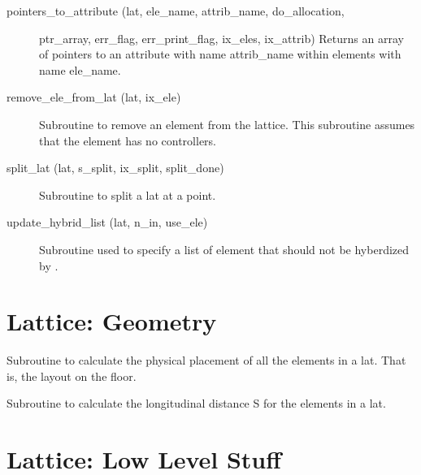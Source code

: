 \begin{description}
\item[pointers_to_attribute (lat, ele_name, attrib_name, do_allocation,] \Newline 
                    ptr_array, err_flag, err_print_flag, ix_eles, ix_attrib)
Returns an array of pointers to an attribute with name attrib_name within 
elements with name ele_name.

\item[remove_ele_from_lat (lat, ix_ele)] \Newline 
Subroutine to remove an element from the lattice.
This subroutine assumes that the element has no controllers.

\item[split_lat (lat, s_split, ix_split, split_done)] \Newline
Subroutine to split a lat at a point.

\item[update_hybrid_list (lat, n_in, use_ele)] \Newline
Subroutine used to specify a list of element that should not be
hyberdized by .

\end{description}

\section{Lattice: Geometry}
\label{r:geom}     

\begin{description}

\item[lat_geometry (lat)] \Newline
Subroutine to calculate the physical placement of all the elements in a lat. 
That is, the layout on the floor. 

\item[s_calc (lat)] \Newline
Subroutine to calculate the longitudinal distance S for the elements in a lat. 

\end{description}

\section{Lattice: Low Level Stuff}
\label{r:low.help} 

